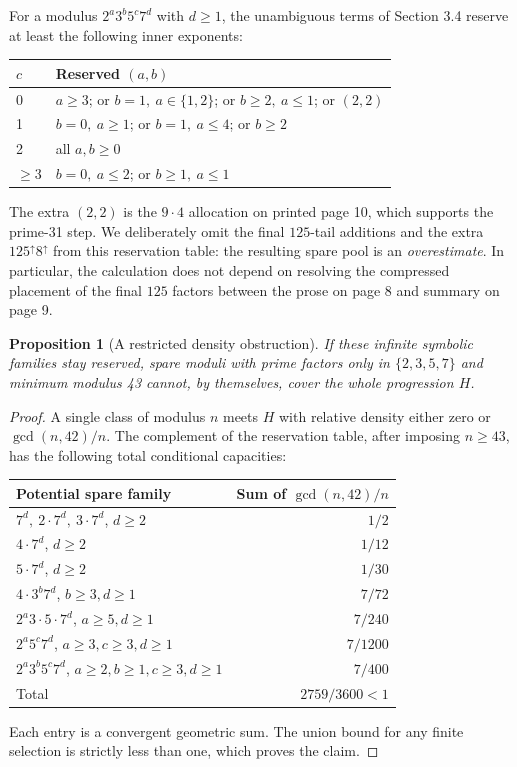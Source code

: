 \documentclass[11pt]{article}
\newtheorem{proposition}{Proposition}
\begin{document}
For a modulus $2^a3^b5^c7^d$ with $d\geq1$, the unambiguous terms of
Section 3.4 reserve at least the following inner exponents:
\begin{center}
\begin{tabular}{ll}
\toprule
$c$ & Reserved $(a,b)$\\
\midrule
0 & $a\geq3$; or $b=1,\ a\in\{1,2\}$; or $b\geq2,\ a\leq1$; or $(2,2)$\\
1 & $b=0,\ a\geq1$; or $b=1,\ a\leq4$; or $b\geq2$\\
2 & all $a,b\geq0$\\
$\geq3$ & $b=0,\ a\leq2$; or $b\geq1,\ a\leq1$\\
\bottomrule
\end{tabular}
\end{center}
The extra $(2,2)$ is the $9\cdot4$ allocation on printed page 10, which
supports the prime-31 step. We deliberately omit the final $125$-tail
additions and the extra $125^\uparrow8^\uparrow$ from this reservation
table: the resulting spare pool is an \emph{overestimate}. In particular,
the calculation does not depend on resolving the compressed placement of
the final $125$ factors between the prose on page 8 and summary on page 9.

\begin{proposition}[A restricted density obstruction]
If these infinite symbolic families stay reserved, spare moduli with prime
factors only in $\{2,3,5,7\}$ and minimum modulus 43 cannot, by themselves,
cover the whole progression $H$.
\end{proposition}
\begin{proof}
A single class of modulus $n$ meets $H$ with relative density either zero
or $\gcd(n,42)/n$. The complement of the reservation table, after imposing
$n\geq43$, has the following total conditional capacities:
\begin{center}
\begin{tabular}{lr}
\toprule
Potential spare family & Sum of $\gcd(n,42)/n$\\
\midrule
$7^d,\ 2\cdot7^d,\ 3\cdot7^d$, $d\geq2$ & $1/2$\\
$4\cdot7^d$, $d\geq2$ & $1/12$\\
$5\cdot7^d$, $d\geq2$ & $1/30$\\
$4\cdot3^b7^d$, $b\geq3,d\geq1$ & $7/72$\\
$2^a3\cdot5\cdot7^d$, $a\geq5,d\geq1$ & $7/240$\\
$2^a5^c7^d$, $a\geq3,c\geq3,d\geq1$ & $7/1200$\\
$2^a3^b5^c7^d$, $a\geq2,b\geq1,c\geq3,d\geq1$ & $7/400$\\
\midrule
Total & $2759/3600<1$\\
\bottomrule
\end{tabular}
\end{center}
Each entry is a convergent geometric sum. The union bound for any finite
selection is strictly less than one, which proves the claim.
\end{proof}
\end{document}
